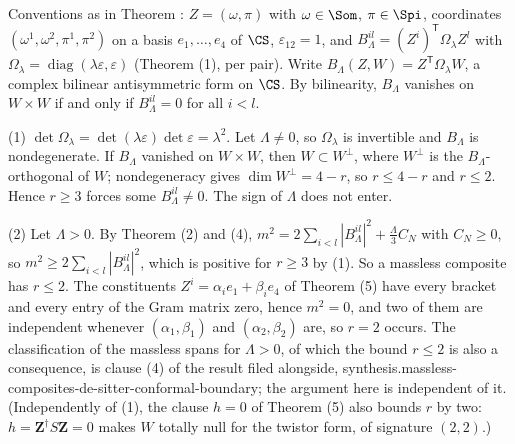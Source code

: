 Conventions as in Theorem : $Z = (\omega, \pi)$ with $\omega \in \Som$, $\pi \in \Spi$, coordinates $(\omega^{1}, \omega^{2}, \pi^{1}, \pi^{2})$ on a basis $e_{1}, \dots, e_{4}$ of $\CS$, $\varepsilon_{12} = 1$, and $B^{il}_{\Lambda} = (Z^{i})^{\mathsf T}\Omega_{\lambda}Z^{l}$ with $\Omega_{\lambda} = \operatorname{diag}(\lambda\varepsilon, \varepsilon)$ (Theorem (1), per pair). Write $B_{\Lambda}(Z, W) = Z^{\mathsf T}\Omega_{\lambda}W$, a complex bilinear antisymmetric form on $\CS$. By bilinearity, $B_{\Lambda}$ vanishes on $W \times W$ if and only if $B^{il}_{\Lambda} = 0$ for all $i < l$.

(1) $\det\Omega_{\lambda} = \det(\lambda\varepsilon)\det\varepsilon = \lambda^{2}$. Let $\Lambda \ne 0$, so $\Omega_{\lambda}$ is invertible and $B_{\Lambda}$ is nondegenerate. If $B_{\Lambda}$ vanished on $W \times W$, then $W \subset W^{\perp}$, where $W^{\perp}$ is the $B_{\Lambda}$-orthogonal of $W$; nondegeneracy gives $\dim W^{\perp} = 4 - r$, so $r \le 4 - r$ and $r \le 2$. Hence $r \ge 3$ forces some $B^{il}_{\Lambda} \ne 0$. The sign of $\Lambda$ does not enter.

(2) Let $\Lambda > 0$. By Theorem (2) and (4), $m^{2} = 2\sum_{i<l}|B^{il}_{\Lambda}|^{2} + \tfrac{\Lambda}{3}C_{N}$ with $C_{N} \ge 0$, so $m^{2} \ge 2\sum_{i<l}|B^{il}_{\Lambda}|^{2}$, which is positive for $r \ge 3$ by (1). So a massless composite has $r \le 2$. The constituents $Z^{i} = \alpha_{i}e_{1} + \beta_{i}e_{4}$ of Theorem (5) have every bracket and every entry of the Gram matrix zero, hence $m^{2} = 0$, and two of them are independent whenever $(\alpha_{1}, \beta_{1})$ and $(\alpha_{2}, \beta_{2})$ are, so $r = 2$ occurs. The classification of the massless spans for $\Lambda > 0$, of which the bound $r \le 2$ is also a consequence, is clause (4) of the result filed alongside, synthesis.massless-composites-de-sitter-conformal-boundary; the argument here is independent of it. (Independently of (1), the clause $h = 0$ of Theorem (5) also bounds $r$ by two: $h = \mathbf{Z}^{\dagger}S\mathbf{Z} = 0$ makes $W$ totally null for the twistor form, of signature $(2,2)$.)

